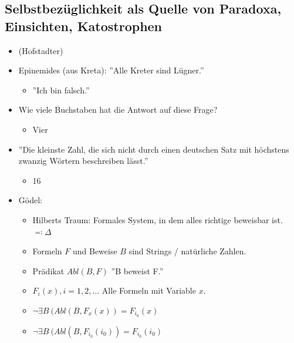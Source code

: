 \subsection{Selbstbezüglichkeit als Quelle von Paradoxa, Einsichten, Katostrophen}
\begin{itemize}
	\item (Hofstadter)
	\item Epinemides (aus Kreta): ''Alle Kreter sind Lügner.''
	\begin{itemize}
		\item ''Ich bin falsch.''
	\end{itemize}
	\item Wie viele Buchstaben hat die Antwort auf diese Frage?
	\begin{itemize}
		\item Vier
	\end{itemize}
	\item ''Die kleinste Zahl, die sich nicht durch einen deutschen Satz mit höchstens zwanzig Wörtern beschreiben lässt.''
	\begin{itemize}
		\item 16
	\end{itemize}
	\item Gödel:
	\begin{itemize}
		\item Hilberts Traum: Formales System, in dem alles richtige beweisbar ist. $\eqqcolon \Delta$
		\item Formeln $F$ und Beweise $B$ sind Strings / natürliche Zahlen.
		\item Prädikat $Abl( B, F )$ \qquad ''B beweist F.''
		\item $F_i( x ) , i = 1 , 2 , \dotsc$ \qquad Alle Formeln mit Variable $x$.
		\item $\neg \exists B~( Abl( B , F_x( x ) ) = F_{i_0}( x )$
		\item $\neg \exists B~( Abl( B , F_{i_0}( i_0 ) ) = F_{i_0}( i_0 )$
	\end{itemize}
\end{itemize}

